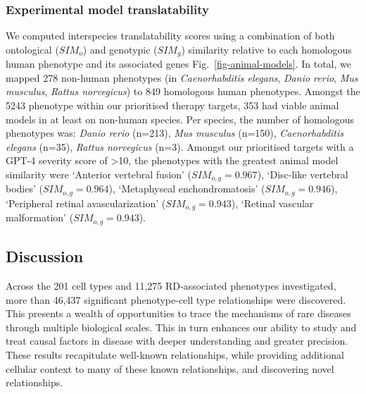 \documentclass[
]{agujournal2019}
\begin{document}
\subsubsection{Experimental model
translatability}\label{experimental-model-translatability}

We computed interspecies translatability scores using a combination of
both ontological (\(SIM_{o}\)) and genotypic (\(SIM_{g}\)) similarity
relative to each homologous human phenotype and its associated genes
Fig.~\ref{fig-animal-models}. In total, we mapped 278 non-human
phenotypes (in \emph{Caenorhabditis elegans}, \emph{Danio rerio},
\emph{Mus musculus}, \emph{Rattus norvegicus}) to 849 homologous human
phenotypes. Amongst the 5243 phenotype within our prioritised therapy
targets, 353 had viable animal models in at least on non-human species.
Per species, the number of homologous phenotypes was: \emph{Danio rerio}
(n=213), \emph{Mus musculus} (n=150), \emph{Caenorhabditis elegans}
(n=35), \emph{Rattus norvegicus} (n=3). Amongst our prioritised targets
with a GPT-4 severity score of \textgreater10, the phenotypes with the
greatest animal model similarity were `Anterior vertebral fusion'
(\(SIM_{o,g}=0.967\)), `Disc-like vertebral bodies'
(\(SIM_{o,g}=0.964\)), `Metaphyseal enchondromatosis'
(\(SIM_{o,g}=0.946\)), `Peripheral retinal avascularization'
(\(SIM_{o,g}=0.943\)), `Retinal vascular malformation'
(\(SIM_{o,g}=0.943\)).

\subsection{Discussion}\label{sec-discussion}

Across the 201 cell types and 11,275 RD-associated phenotypes
investigated, more than 46,437 significant phenotype-cell type
relationships were discovered. This presents a wealth of opportunities
to trace the mechanisms of rare diseases through multiple biological
scales. This in turn enhances our ability to study and treat causal
factors in disease with deeper understanding and greater precision.
These results recapitulate well-known relationships, while providing
additional cellular context to many of these known relationships, and
discovering novel relationships.
\end{document}
